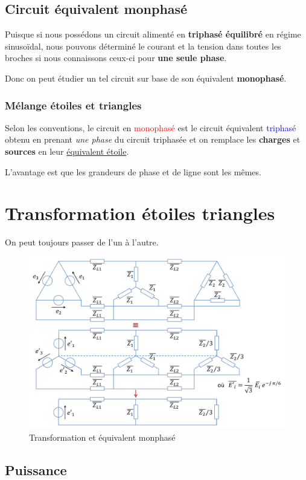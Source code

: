\documentclass{report}
\begin{document}
\subsection{Circuit équivalent monphasé}
Puisque si nous possédons un circuit alimenté en \textbf{triphasé équilibré} en régime sinusoïdal, nous pouvons déterminé le courant et la tension dans toutes les broches si nous connaissons ceux-ci pour \textbf{une seule phase}.\par
Donc on peut étudier un tel circuit sur base de son équivalent \textbf{monophasé}.

\subsubsection{Mélange étoiles et triangles}
Selon les conventions, le circuit en \textcolor{red}{monophasé} est le circuit équivalent \textcolor{blue}{triphasé} obtenu en prenant \textit{une phase} du circuit triphasée et on remplace les \textbf{charges} et \textbf{sources} en leur \underline{équivalent étoile}.\par
L'avantage est que les grandeurs de phase et de ligne sont les mêmes.

\section{Transformation étoiles triangles}
On peut toujours passer de l'un à l'autre.
\begin{figure}[H]
\centering
\includegraphics[width=12cm]{img/transfoEtoilesTriangles.png}
\caption{Transformation et équivalent monphasé}
\end{figure}

\subsection{Puissance}
\end{document}
